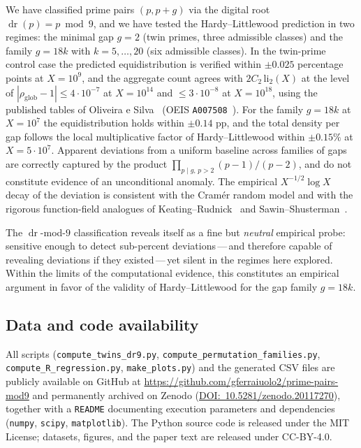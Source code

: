 \documentclass[11pt]{amsart}
\theoremstyle{plain}
\theoremstyle{definition}
\theoremstyle{remark}
\DeclareMathOperator{\dr}{dr}
\begin{document}
We have classified prime pairs $(p,p+g)$ via the digital root
$\dr(p) = p \bmod 9$, and we have tested the Hardy--Littlewood
prediction in two regimes: the minimal gap $g=2$ (twin primes, three
admissible classes) and the family $g=18k$ with $k=5,\ldots,20$ (six
admissible classes). In the twin-prime control case the predicted
equidistribution is verified within $\pm 0.025$ percentage points at
$X = 10^9$, and the aggregate count agrees with $2C_2\,\mathrm{li}_2(X)$
at the level of $|\rho_{\mathrm{glob}}-1| \le 4 \cdot 10^{-7}$ at
$X = 10^{14}$ and $\le 3 \cdot 10^{-8}$ at $X = 10^{18}$, using the
published tables of Oliveira e Silva~\cite{TOS} (OEIS
\texttt{A007508}~\cite{OEISA007508}). For the family $g=18k$ at
$X = 10^7$ the equidistribution holds within $\pm 0.14$ pp, and the
total density per gap follows the local multiplicative factor of
Hardy--Littlewood within $\pm 0.15\%$ at $X = 5 \cdot 10^7$. Apparent
deviations from a uniform baseline across families of gaps are
correctly captured by the product
$\prod_{p \mid g,\,p>2}(p-1)/(p-2)$, and do not constitute evidence
of an unconditional anomaly. The empirical $X^{-1/2}\log X$ decay of
the deviation is consistent with the Cram\'er random model and with
the rigorous function-field analogues of
Keating--Rudnick~\cite{KR14} and Sawin--Shusterman~\cite{SS22}.

The $\dr$-mod-$9$ classification reveals itself as a fine but
\emph{neutral} empirical probe: sensitive enough to detect
sub-percent deviations\,---\,and therefore capable of revealing
deviations if they existed\,---\,yet silent in the regimes here
explored. Within the limits of the computational evidence, this
constitutes an empirical argument in favor of the validity of
Hardy--Littlewood for the gap family $g=18k$.

\subsection*{Data and code availability}
All scripts (\texttt{compute\_twins\_dr9.py},
\texttt{compute\_permutation\_families.py},
\texttt{compute\_R\_regression.py}, \texttt{make\_plots.py}) and the
generated CSV files are publicly available on GitHub at
\url{https://github.com/gferraiuolo2/prime-pairs-mod9}
and permanently archived on Zenodo
(\href{https://doi.org/10.5281/zenodo.20117270}{DOI:~10.5281/zenodo.20117270}),
together with a \texttt{README} documenting execution parameters and
dependencies (\texttt{numpy}, \texttt{scipy}, \texttt{matplotlib}).
The Python source code is released under the MIT License; datasets,
figures, and the paper text are released under CC-BY-4.0.
\end{document}
